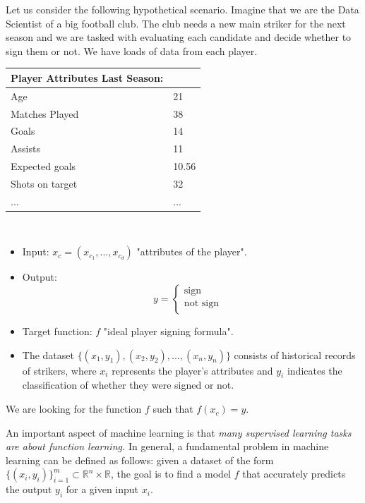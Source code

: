 \documentclass[../main.tex]{subfiles}
\begin{document}
	\begin{xmpl}
	
	Let us consider the following hypothetical scenario.  Imagine that we are the Data Scientist of a big football club. The club needs a new main striker for the next season and we are tasked with evaluating each candidate and decide whether to sign them or not. We have loads of data from each player. \\ 
	
	\begin{tabular}{ll}
		\toprule
		\textbf{Player Attributes Last Season:}  \\ 
		\midrule
		Age & 21 \\
		Matches Played & 38 \\
		Goals& 14\\
		Assists & 11\\
		Expected goals & 10.56 \\
		Shots on target& 32 \\
		... & ... \\
		\bottomrule
	\end{tabular} 
	\\ 
	\begin{itemize}
		\item Input: \textbf{$x_c=(x_{c_1},...,x_{c_d})$}  "attributes of the player". 
		\item Output:  
		\[
		y = \begin{cases}
			\text{sign} \\
			\text{not sign}& \\
		\end{cases}
		\]
		
		\item Target function: $f$  "ideal player signing formula".
		\item The dataset $\{(x_1, y_1), (x_2, y_2), ..., (x_n, y_n)\}$ consists of historical records of strikers, where $x_i$ represents the player's attributes and $y_i$ indicates the classification of whether they were signed or not.
	\end{itemize}
	
	\noindent We are looking for the function $f$ such that $f(x_c)=y$.
	\end{xmpl}
	\noindent 
	An important aspect of machine learning is that \textit{many supervised learning tasks are about function learning.} In general, a fundamental problem in machine learning can be defined as follows: given a dataset of the form $\{(x_i,y_i)\}^m_{i=1} \subset \mathbb{R}^n \times \mathbb{R}$, the goal is to find a model $f$ that accurately predicts the output $y_i$ for a given input $x_i$.
	
\end{document}
